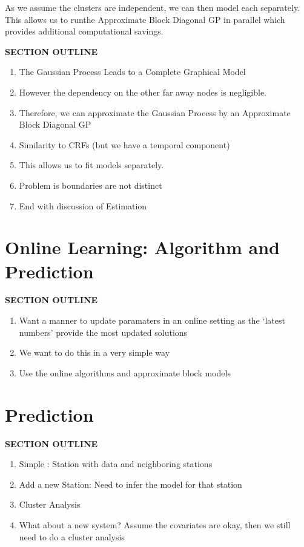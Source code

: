 \documentclass{acm_proc_article-sp}
\begin{document}
As we assume the clusters are independent, we can then model each separately.  This allows us to runthe Approximate Block Diagonal GP in parallel which provides additional computational savings.

\vspace{0.25cm}
{\bf SECTION OUTLINE}
\begin{enumerate}
\item The Gaussian Process Leads to a Complete Graphical Model
\item However the dependency on the other far away nodes is negligible.
\item Therefore, we can approximate the Gaussian Process by an Approximate Block Diagonal GP
\item Similarity to CRFs (but we have a temporal component)
\item This allows us to fit models separately.
\item Problem is boundaries are not distinct
\item End with discussion of Estimation
\end{enumerate}
\vspace{0.5cm}

\section{Online Learning: Algorithm and Prediction}

\vspace{0.25cm}
{\bf SECTION OUTLINE}
\begin{enumerate}
\item Want a manner to update paramaters in an online setting as the `latest numbers' provide the most updated solutions
\item We want to do this in a very simple way
\item Use the online algorithms and approximate block models
\end{enumerate}
\vspace{0.5cm}

\section{Prediction}
{\bf SECTION OUTLINE}
\begin{enumerate}
\item Simple : Station with data and neighboring stations
\item Add a new Station:   Need to infer the model for that station
\item Cluster Analysis
\item What about a new system?  Assume the covariates are okay, then we still need to do a cluster analysis
\end{enumerate}
\vspace{0.5cm}
\end{document}
